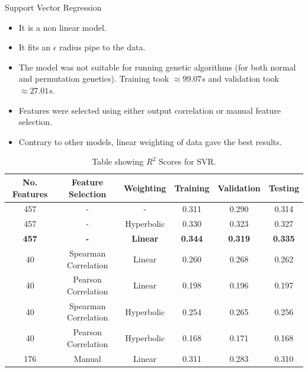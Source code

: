 \documentclass{beamer}
\begin{document}
\begin{frame}[t]{Support Vector Regression}
\begin{itemize}
\item It is a non linear model.
\item It fits an $\epsilon$ radius pipe to the data.
\item The model was not suitable for running genetic algorithms (for both normal and permutation genetics).  Training took $\approx 99.07 s$ and validation took $\approx 27.01 s$.
\item Features were selected using either output correlation or manual feature selection.
\item Contrary to other models,  linear weighting of data gave the best results.
\end{itemize}

\begin{table} [h!]
\centering
\resizebox{0.7\linewidth}{!} {
 \begin{tabular}{ | c | c | c | c | c | c | }
\hline
\textbf{No. Features} & \textbf{Feature Selection} & \textbf{Weighting} & \textbf{Training} & \textbf{Validation} &  \textbf{Testing} \\ [0.5 ex]
\hline \hline
457 & - & - & 0.311 & 0.290 & 0.314\\
457 & - & Hyperbolic & 0.330 & 0.323 & 0.327\\
\textbf{457} & \textbf{-} & \textbf{Linear}  & \textbf{0.344} &\textbf{0.319} & \textbf{0.335}\\
40 & Spearman Correlation & Linear & 0.260 & 0.268  & 0.262 \\ 
40 & Pearson Correlation & Linear & 0.198 & 0.196 & 0.197 \\ 
40 & Spearman Correlation & Hyperbolic & 0.254 & 0.265 & 0.256 \\ 
40 & Pearson Correlation & Hyperbolic & 0.168 & 0.171 & 0.168 \\ 
176 & Manual & Linear &  0.311  & 0.283  & 0.310\\ [1ex]
\hline
\end{tabular}
}
\caption{Table showing  $R^2$ Scores for SVR.}
\label {table:2}
\end{table}

\end{frame}
\end{document}
